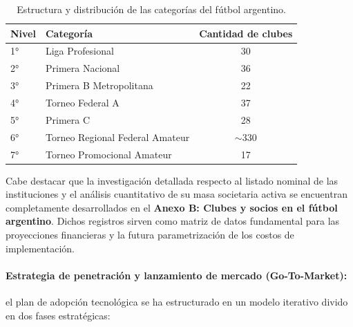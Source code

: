 \begin{table}[h!]
\centering
\renewcommand{\arraystretch}{1.3}
\begin{tabular}{|l|l|c|}
\hline
\rowcolor{gray!20} \textbf{Nivel} & \textbf{Categoría} & \textbf{Cantidad de clubes} \\ \hline
1° & Liga Profesional & 30 \\ \hline
2° & Primera Nacional & 36 \\ \hline
3° & Primera B Metropolitana & 22 \\ \hline
4° & Torneo Federal A & 37 \\ \hline
5° & Primera C & 28 \\ \hline
6° & Torneo Regional Federal Amateur & $\sim$330 \\ \hline
7° & Torneo Promocional Amateur & 17 \\ \hline
\end{tabular}
\caption{Estructura y distribución de las categorías del fútbol argentino.}
\label{tab:categorias_futbol}
\end{table}

Cabe destacar que la investigación detallada respecto al listado nominal de las instituciones y el análisis cuantitativo de su masa societaria activa se encuentran completamente desarrollados en el \textbf{Anexo B: Clubes y socios en el fútbol argentino}. Dichos registros sirven como matriz de datos fundamental para las proyecciones financieras y la futura parametrización de los costos de implementación.

\newpage

\paragraph{Estrategia de penetración y lanzamiento de mercado (Go-To-Market):}

el plan de adopción tecnológica se ha estructurado en un modelo iterativo divido en dos fases estratégicas:

